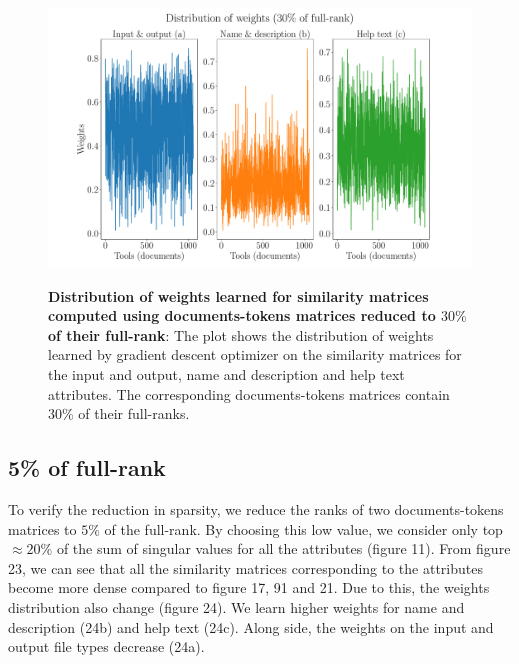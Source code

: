 \begin{figure}[h]
\begin{centering}
    {\includegraphics[scale=0.35]{figures/Weights_030.pdf}}
    \caption[Distribution of weights learned for similarity matrices computed using documents-tokens matrices reduced to $30\%$ of their full-rank]{\textbf{Distribution of weights learned for similarity matrices computed using documents-tokens matrices reduced to $30\%$ of their full-rank}: The plot shows the distribution of weights learned by gradient descent optimizer on the similarity matrices for the input and output, name and description and help text attributes. The corresponding documents-tokens matrices contain $30\%$ of their full-ranks.}
\end{centering}
\end{figure}

\subsection{5\% of full-rank}
To verify the reduction in sparsity, we reduce the ranks of two documents-tokens matrices to $5\%$ of the full-rank. By choosing this low value, we consider only top $\approx 20\%$ of the sum of singular values for all the attributes (figure 11). From figure 23, we can see that all the similarity matrices corresponding to the attributes become more dense compared to figure 17, 91 and 21. Due to this, the weights distribution also change (figure 24). We learn higher weights for name and description (24b) and help text (24c). Along side, the weights on the input and output file types decrease (24a).

